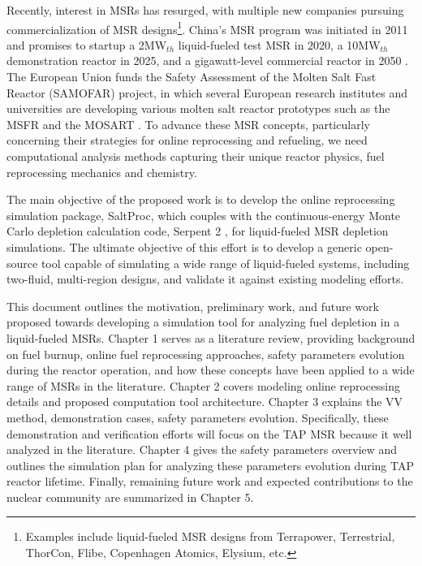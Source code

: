 Recently, interest in \glspl{MSR} has resurged, with multiple new companies 
pursuing commercialization of \gls{MSR} designs\footnote{Examples 
include liquid-fueled \gls{MSR} designs from Terrapower, Terrestrial, 
ThorCon, Flibe, Copenhagen Atomics, Elysium, etc.}. China's \gls{MSR} program 
was initiated in 2011 and promises to startup a 2MW$_{th}$ 
liquid-fueled test \gls{MSR} in 2020, a 10MW$_{th}$ 
demonstration reactor in 2025, and a gigawatt-level 
commercial reactor in 2050 \cite{zhang_review_2018}. The European 
Union funds the Safety Assessment of the Molten Salt Fast Reactor 
(SAMOFAR) project, in which several European research institutes and 
universities are developing various molten salt reactor prototypes 
such as the \gls{MSFR} \cite{fiorina_molten_2013} and the \gls{MOSART} 
\cite{ignatiev_molten_2014}. To advance these \gls{MSR} concepts, particularly 
concerning their strategies for online reprocessing and refueling, 
we need computational analysis methods capturing their unique reactor physics, 
 fuel reprocessing mechanics and chemistry. 

The main objective of the proposed work is to develop the online 
reprocessing simulation package, SaltProc, which couples with the 
continuous-energy Monte Carlo depletion calculation code, Serpent 2 
\cite{leppanen_serpent_2015}, for liquid-fueled \gls{MSR} depletion 
simulations. The ultimate objective of this effort is to develop a generic 
open-source tool capable of simulating a wide range of liquid-fueled 
systems, including two-fluid, multi-region designs, and validate it against 
existing modeling efforts. 

This document outlines the motivation, preliminary work, and future work 
proposed towards developing a simulation tool for analyzing fuel depletion in 
a liquid-fueled \glspl{MSR}. Chapter 1 serves as a literature review, 
providing background on fuel burnup, online fuel reprocessing approaches, 
safety parameters evolution during the reactor operation, and how these 
concepts have been applied to a wide range of \glspl{MSR} in the literature. 
Chapter 2 covers modeling online reprocessing details and proposed computation 
tool architecture. Chapter 3 explains the \gls{VV} method, demonstration 
cases, safety parameters evolution. Specifically, these demonstration and 
verification efforts will focus on the \gls{TAP} \gls{MSR} because it well 
analyzed in the literature. Chapter 4 gives the safety parameters overview and 
outlines the simulation plan for analyzing these parameters evolution during 
\gls{TAP} reactor lifetime. Finally, remaining future work and expected 
contributions to the nuclear community are summarized in Chapter 5.

